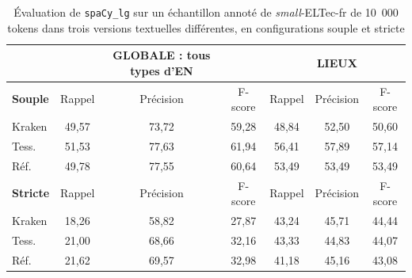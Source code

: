 \begin{table}[h!]
\centering
\scriptsize{\begin{tabular}{l|ccc|ccc}
 &		&	GLOBALE	: tous types d'EN &		&		&	LIEUX &		\\
\hline
 \hline
\textbf{Souple}	&	Rappel		&Précision	&	F-score	&	Rappel&		Précision		&F-score	\\
 \hline
Kraken	&	49,57	&	73,72 	&	59,28	&	48,84	&	52,50	&	50,60	\\
													
Tess.	&	51,53	&	77,63	&	61,94	&	56,41	&	57,89	&	57,14	\\
													
Réf.	&	49,78	&	77,55	&	60,64	&	53,49	&	53,49	&	53,49	\\
\hline
\hline
\textbf{Stricte}	&	Rappel		&Précision	&	F-score	&	Rappel&		Précision		&F-score	 \\
\hline
Kraken	&	18,26	&	58,82	&	27,87	&	43,24	&	45,71	&	44,44	\\
Tess.	&	21,00	&	68,66	&	32,16	&	43,33	&	44,83	&	44,07	\\
Réf.	&	21,62	&	69,57	&	32,98	&	41,18	&	45,16	&	43,08	\\
\hline
\hline
\end{tabular}}
\caption{Évaluation de \texttt{spaCy\_lg} sur un échantillon annoté de \textit{small}-ELTec-fr de 10~000 tokens dans trois versions textuelles différentes\label{tab:eval-supervise}, en configurations souple et stricte 
}
 \end{table}

